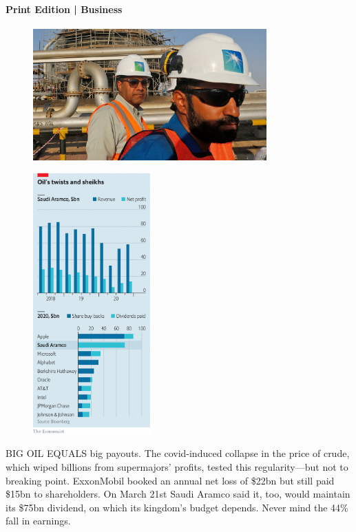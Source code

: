 \documentclass{article}
\begin{document}
\paragraph{Print Edition | Business  \quad \color{gray}{Mar 27th 2021 }}
\begin{figure}[h]
\centering
\includegraphics[width=0.8\textwidth]{images/20210327_wbp504.jpg}
\end{figure}
\begin{figure}[h]
\centering
\includegraphics[width=0.4\textwidth]{images/20210327_wbc268.png}
\end{figure}


\lettrine{B}IG OIL EQUALS big payouts. The covid-induced collapse in the price of crude, which wiped billions from supermajors' profits, tested this regularity---but not to breaking point. ExxonMobil booked an annual net loss of \$22bn but still paid \$15bn to shareholders. On March 21st Saudi Aramco said it, too, would maintain its \$75bn dividend, on which its kingdom's budget depends. Never mind the 44\% fall in earnings.{} 
\clearpage
\end{document}

